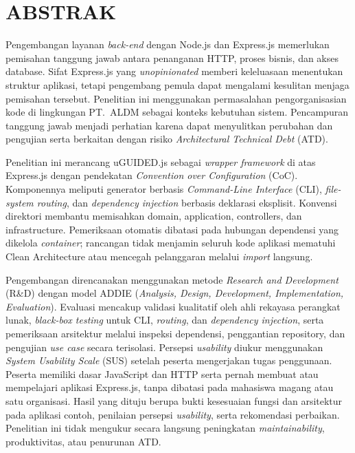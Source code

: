 \documentclass[12pt,a4paper,oneside]{report}
\begin{document}
\chapter*{ABSTRAK}
\begin{singlespace}

Pengembangan layanan \textit{back-end} dengan Node.js dan Express.js memerlukan pemisahan tanggung jawab antara penanganan HTTP, proses bisnis, dan akses database. Sifat Express.js yang \textit{unopinionated} memberi keleluasaan menentukan struktur aplikasi, tetapi pengembang pemula dapat mengalami kesulitan menjaga pemisahan tersebut. Penelitian ini menggunakan permasalahan pengorganisasian kode di lingkungan PT.\ ALDM sebagai konteks kebutuhan sistem. Pencampuran tanggung jawab menjadi perhatian karena dapat menyulitkan perubahan dan pengujian serta berkaitan dengan risiko \textit{Architectural Technical Debt} (ATD).

Penelitian ini merancang uGUIDED.js sebagai \textit{wrapper framework} di atas Express.js dengan pendekatan \textit{Convention over Configuration} (CoC). Komponennya meliputi generator berbasis \textit{Command-Line Interface} (CLI), \textit{file-system routing}, dan \textit{dependency injection} berbasis deklarasi eksplisit. Konvensi direktori membantu memisahkan domain, application, controllers, dan infrastructure. Pemeriksaan otomatis dibatasi pada hubungan dependensi yang dikelola \textit{container}; rancangan tidak menjamin seluruh kode aplikasi mematuhi Clean Architecture atau mencegah pelanggaran melalui \textit{import} langsung.

Pengembangan direncanakan menggunakan metode \textit{Research and Development} (R\&D) dengan model ADDIE (\textit{Analysis, Design, Development, Implementation, Evaluation}). Evaluasi mencakup validasi kualitatif oleh ahli rekayasa perangkat lunak, \textit{black-box testing} untuk CLI, \textit{routing}, dan \textit{dependency injection}, serta pemeriksaan arsitektur melalui inspeksi dependensi, penggantian repository, dan pengujian \textit{use case} secara terisolasi. Persepsi \textit{usability} diukur menggunakan \textit{System Usability Scale} (SUS) setelah peserta mengerjakan tugas penggunaan. Peserta memiliki dasar JavaScript dan HTTP serta pernah membuat atau mempelajari aplikasi Express.js, tanpa dibatasi pada mahasiswa magang atau satu organisasi. Hasil yang dituju berupa bukti kesesuaian fungsi dan arsitektur pada aplikasi contoh, penilaian persepsi \textit{usability}, serta rekomendasi perbaikan. Penelitian ini tidak mengukur secara langsung peningkatan \textit{maintainability}, produktivitas, atau penurunan ATD.

\end{singlespace}
\end{document}
